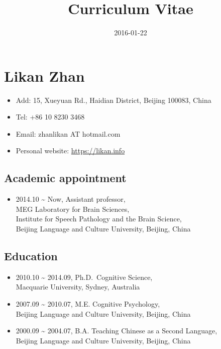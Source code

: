 \documentclass[10pt,]{article}
\title{Curriculum Vitae}
\date{2016-01-22}
\providecommand{\tightlist}{%
  \setlength{\itemsep}{0pt}\setlength{\parskip}{0pt}}
\begin{document}

\hypertarget{likan-zhan}{%
\section{Likan Zhan}\label{likan-zhan}}

\begin{itemize}
\tightlist
\item
  Add: 15, Xueyuan Rd., Haidian District, Beijing 100083, China
\item
  Tel: +86 10 8230 3468
\item
  Email: zhanlikan AT hotmail.com
\item
  Personal website: \url{https://likan.info}
\end{itemize}

\hypertarget{academic-appointment}{%
\subsection{Academic appointment}\label{academic-appointment}}

\begin{itemize}
\tightlist
\item
  2014.10 \textasciitilde{} Now, Assistant professor,\\
  MEG Laboratory for Brain Sciences, \\
  Institute for Speech Pathology and the Brain Science,\\
  Beijing Language and Culture University, Beijing, China
\end{itemize}

\hypertarget{education}{%
\subsection{Education}\label{education}}

\begin{itemize}
\item
  2010.10 \textasciitilde{} 2014.09, Ph.D.~Cognitive Science, \\
  Macquarie University, Sydney, Australia
\item
  2007.09 \textasciitilde{} 2010.07, M.E. Cognitive Psychology, \\
  Beijing Language and Culture University, Beijing, China
\item
  2000.09 \textasciitilde{} 2004.07, B.A. Teaching Chinese as a Second
  Language, \\
  Beijing Language and Culture University, Beijing, China
\end{itemize}
\end{document}
